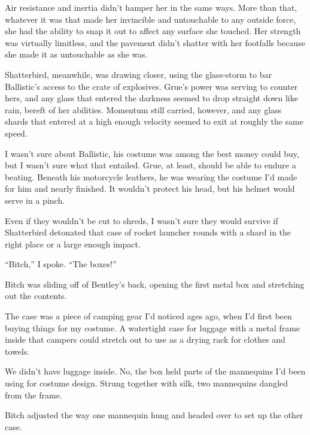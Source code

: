 Air resistance and inertia didn't hamper her in the same ways.  More than that, whatever it was that made her invincible and untouchable to any outside force, she had the ability to snap it out to affect any surface she touched.  Her strength was virtually limitless, and the pavement didn't shatter with her footfalls because she made it as untouchable as she was.



Shatterbird, meanwhile, was drawing closer, using the glass-storm to bar Ballistic's access to the crate of explosives.  Grue's power was serving to counter hers, and any glass that entered the darkness seemed to drop straight down like rain, bereft of her abilities.  Momentum still carried, however, and any glass shards that entered at a high enough velocity seemed to exit at roughly the same speed.



I wasn't sure about Ballistic, his costume was among the best money could buy, but I wasn't sure what that entailed.  Grue, at least, should be able to endure a beating.  Beneath his motorcycle leathers, he was wearing the costume I'd made for him and nearly finished.  It wouldn't protect his head, but his helmet would serve in a pinch.



Even if they wouldn't be cut to shreds, I wasn't sure they would survive if Shatterbird detonated that case of rocket launcher rounds with a shard in the right place or a large enough impact.



``Bitch,'' I spoke.  ``The boxes!''



Bitch was sliding off of Bentley's back, opening the first metal box and stretching out the contents.



The case was a piece of camping gear I'd noticed ages ago, when I'd first been buying things for my costume.  A watertight case for luggage with a metal frame inside that campers could stretch out to use as a drying rack for clothes and towels.



We didn't have luggage inside.  No, the box held parts of the mannequins I'd been using for costume design.  Strung together with silk, two mannequins dangled from the frame.



Bitch adjusted the way one mannequin hung and headed over to set up the other case.



